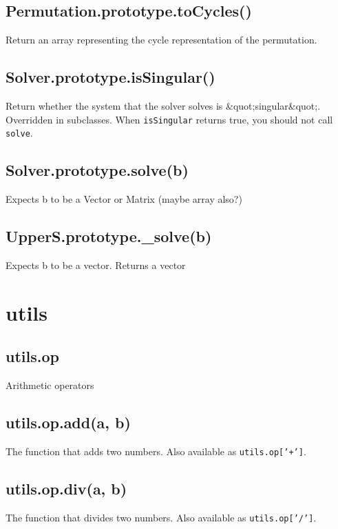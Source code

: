 \documentclass{article}
\begin{document}
    \subsection*{Permutation.prototype.toCycles()}
    Return an array representing the cycle representation of the permutation.


    \subsection*{Solver.prototype.isSingular()}
    Return whether the system that the solver solves is \&quot;singular\&quot;. Overridden in
subclasses.
When \texttt{isSingular} returns true, you should not call \texttt{solve}.


    \subsection*{Solver.prototype.solve(b)}
    Expects b to be a Vector or Matrix (maybe array also?)


    \subsection*{UpperS.prototype.\_solve(b)}
    Expects b to be a vector. Returns a vector


  \section{utils}
    \subsection*{utils.op}
    Arithmetic operators


    \subsection*{utils.op.add(a, b)}
    The function that adds two numbers. Also available as \texttt{utils.op['+']}.


    \subsection*{utils.op.div(a, b)}
    The function that divides two numbers. Also available as \texttt{utils.op['/']}.
\end{document}
